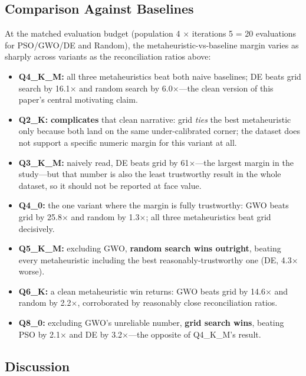 \documentclass[conference, letterpaper]{IEEEtran}
\begin{document}
\subsection{Comparison Against Baselines}
\label{sec:baseline-comparison-real}

At the matched evaluation budget (population 4 $\times$ iterations 5 = 20 evaluations for PSO/GWO/DE and Random), the metaheuristic-vs-baseline margin varies as sharply across variants as the reconciliation ratios above:

\begin{itemize}
  \item \textbf{Q4\_K\_M:} all three metaheuristics beat both naive baselines; DE beats grid search by 16.1$\times$ and random search by 6.0$\times$---the clean version of this paper's central motivating claim.
  \item \textbf{Q2\_K:} \textbf{complicates} that clean narrative: grid \emph{ties} the best metaheuristic only because both land on the same under-calibrated corner; the dataset does not support a specific numeric margin for this variant at all.
  \item \textbf{Q3\_K\_M:} naively read, DE beats grid by 61$\times$---the largest margin in the study---but that number is also the least trustworthy result in the whole dataset, so it should not be reported at face value.
  \item \textbf{Q4\_0:} the one variant where the margin is fully trustworthy: GWO beats grid by 25.8$\times$ and random by 1.3$\times$; all three metaheuristics beat grid decisively.
  \item \textbf{Q5\_K\_M:} excluding GWO, \textbf{random search wins outright}, beating every metaheuristic including the best reasonably-trustworthy one (DE, 4.3$\times$ worse).
  \item \textbf{Q6\_K:} a clean metaheuristic win returns: GWO beats grid by 14.6$\times$ and random by 2.2$\times$, corroborated by reasonably close reconciliation ratios.
  \item \textbf{Q8\_0:} excluding GWO's unreliable number, \textbf{grid search wins}, beating PSO by 2.1$\times$ and DE by 3.2$\times$---the opposite of Q4\_K\_M's result.
\end{itemize}

\subsection{Discussion}
\label{sec:discussion}
\end{document}
